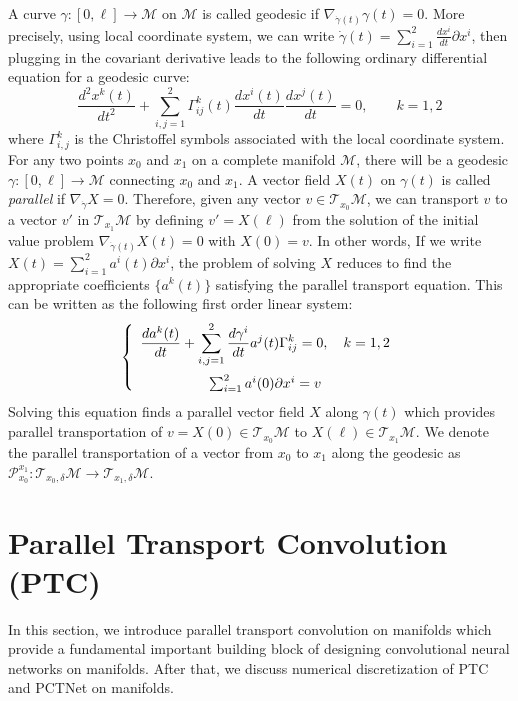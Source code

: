 \documentclass[10pt,twocolumn,letterpaper]{article}
\def\M{\mathcal{M}}
\def\T{\mathcal{T}}
\def\PT{\mathcal{P}}
\begin{document}
A curve $\gamma:[0,\ell] \rightarrow \M$ on $\M$ is called geodesic if $\nabla_{\dot \gamma(t)} \gamma(t) = 0$. More precisely, using local coordinate system, we can write $\displaystyle \dot \gamma (t) = \sum_{i=1}^2 \frac{dx^i}{dt}\partial x^i$, then plugging in the covariant derivative leads to the following ordinary differential equation for a geodesic curve:
\begin{equation}\label{Geodesic Equation}
\frac{d^2x^k(t)}{dt^2} + \sum_{i,j=1}^2 \Gamma^k_{ij}(t) \frac{dx^i(t)}{dt} \frac{dx^j(t)}{dt} = 0, \qquad k = 1, 2
\end{equation}
where $\Gamma^k_{i,j}$ is the Christoffel symbols associated with the local coordinate system.
For any two points $x_0$ and $x_1$ on a complete manifold $\M$, there will be a geodesic $\gamma:[0,\ell] \rightarrow\M$ connecting $x_0$ and $x_1$.
A vector field $X(t)$ on $\gamma(t)$ is called {\it parallel}  if $\nabla_{\dot \gamma} X = 0$. Therefore, given any vector $v \in \T_{x_0} \M$,  we can transport $v$ to a vector $v'$ in $\T_{x_1}\M$ by defining $v' = X(\ell)$ from the solution of the initial value problem $\nabla_{\dot \gamma(t)} X(t) = 0$ with $X(0) = v$.
In other words,
If we write $X(t) = \sum_{i=1}^2 a^i(t)\partial x^i$, the problem of solving $X$ reduces to find the appropriate coefficients $\{a^k(t)\}$ satisfying the parallel transport equation. This can be written as the following first order linear system:
%
\begin{equation}
\left\{\begin{array}{c}
\displaystyle \dfrac{d a^k(t)}{dt} +  \sum_{i,j=1}^2 \dfrac{d \gamma^i}{dt} a^j(t)\Gamma ^k_{ij} = 0, \quad k = 1, 2 \vspace{0.2cm}\\
\sum_{i=1}^2 a^i(0) \partial x^i = v
\end{array}\right.
\end{equation}
%
Solving this equation finds a parallel vector field $X$ along $\gamma(t)$ which provides parallel transportation of $v = X(0) \in\T_{x_0}\M$ to $X(\ell)\in\T_{x_1}\M$. We denote the parallel transportation of a vector from $x_0$ to $x_1$ along the geodesic as $\PT_{x_0}^{x_1}:\T_{x_0,\delta}\M \rightarrow\T_{x_1,\delta}\M$.


\section{Parallel Transport Convolution (PTC)}
\label{sec:PTC}
In this section, we introduce parallel transport convolution on manifolds which provide a fundamental important building block of designing convolutional neural networks on manifolds. After that, we discuss numerical discretization of PTC and PCTNet on manifolds.
\end{document}
